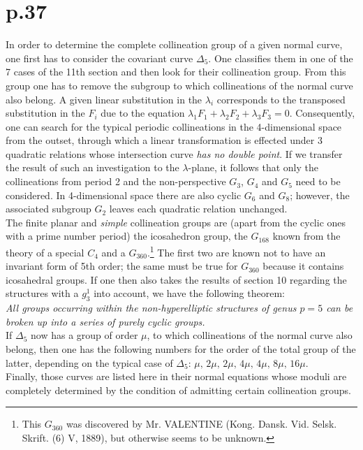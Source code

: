 \documentclass[leqno]{article}
\begin{document}
\section{p.37}
In order to determine the complete collineation group of a given normal curve, one first has to consider the covariant curve $\Delta_5$. One classifies them in one of the 7 cases of the 11th section and then look for their collineation group. From this group one has to remove the subgroup to which collineations of the normal curve also belong. A given linear substitution in the $\lambda_i$ corresponds to the transposed substitution in the $F_i$ due to the equation $\lambda_1 F_1 + \lambda_2 F_2 + \lambda_3 F_3 = 0$. Consequently, one can search for the typical periodic collineations in the 4-dimensional space from the outset, through which a linear transformation is effected under 3 quadratic relations whose intersection curve \textit{has no double point}. If we transfer the result of such an investigation to the $\lambda$-plane, it follows that only the collineations from period 2 and the non-perspective $G_3$, $G_4$ and $G_5$ need to be considered. In 4-dimensional space there are also cyclic $G_6$ and $G_8$; however, the associated subgroup $G_2$ leaves each quadratic relation unchanged. \\
The finite planar and \textit{simple} collineation groups are (apart from the cyclic ones with a prime number period) the icosahedron group, the $G_{168}$ known from the theory of a special $C_4$ and a $G_{360}$.\footnote{This $G_{360}$ was discovered by Mr. VALENTINE (Kong. Dansk. Vid. Selsk. Skrift. (6) V, 1889), but otherwise seems to be unknown.} The first two are known not to have an invariant form of 5th order; the same must be true for $G_{360}$ because it contains icosahedral groups. If one then also takes the results of section 10 regarding the structures with a $g_3^1$ into account, we have the following theorem: \\
\textit{All groups occurring within the non-hyperelliptic structures of genus $p=5$ can be broken up into a series of purely cyclic groups.} \\
If $\Delta_5$ now has a group of order $\mu$, to which collineations of the normal curve also belong, then one has the following numbers for the order of the total group of the latter, depending on the typical case of $\Delta_5$: $\mu, \, 2\mu, \, 2\mu, \, 4\mu, \, 4\mu, \, 8\mu, \, 16\mu$. \\
Finally, those curves are listed here in their normal equations whose moduli are completely determined by the condition of admitting certain collineation groups.
\end{document}
